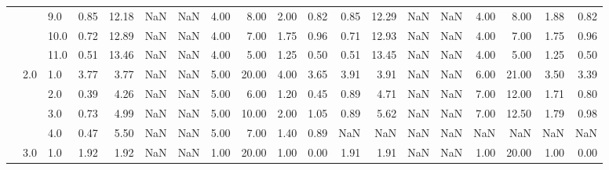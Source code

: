 \begin{tabular}{lllrrrrrrrrrrrrrrrr}
       &     & 9.0  &      0.85 &      12.18 &               NaN &                NaN & 4.00 &   8.00 &             2.00 &                         0.82 &      0.85 &      12.29 &               NaN &                NaN & 4.00 &   8.00 &             1.88 &                         0.82 \\
       &     & 10.0 &      0.72 &      12.89 &               NaN &                NaN & 4.00 &   7.00 &             1.75 &                         0.96 &      0.71 &      12.93 &               NaN &                NaN & 4.00 &   7.00 &             1.75 &                         0.96 \\
       &     & 11.0 &      0.51 &      13.46 &               NaN &                NaN & 4.00 &   5.00 &             1.25 &                         0.50 &      0.51 &      13.45 &               NaN &                NaN & 4.00 &   5.00 &             1.25 &                         0.50 \\
       & 2.0 & 1.0  &      3.77 &       3.77 &               NaN &                NaN & 5.00 &  20.00 &             4.00 &                         3.65 &      3.91 &       3.91 &               NaN &                NaN & 6.00 &  21.00 &             3.50 &                         3.39 \\
       &     & 2.0  &      0.39 &       4.26 &               NaN &                NaN & 5.00 &   6.00 &             1.20 &                         0.45 &      0.89 &       4.71 &               NaN &                NaN & 7.00 &  12.00 &             1.71 &                         0.80 \\
       &     & 3.0  &      0.73 &       4.99 &               NaN &                NaN & 5.00 &  10.00 &             2.00 &                         1.05 &      0.89 &       5.62 &               NaN &                NaN & 7.00 &  12.50 &             1.79 &                         0.98 \\
       &     & 4.0  &      0.47 &       5.50 &               NaN &                NaN & 5.00 &   7.00 &             1.40 &                         0.89 &       NaN &        NaN &               NaN &                NaN &  NaN &    NaN &              NaN &                          NaN \\
       & 3.0 & 1.0  &      1.92 &       1.92 &               NaN &                NaN & 1.00 &  20.00 &             1.00 &                         0.00 &      1.91 &       1.91 &               NaN &                NaN & 1.00 &  20.00 &             1.00 &                         0.00 \\

\end{tabular}
